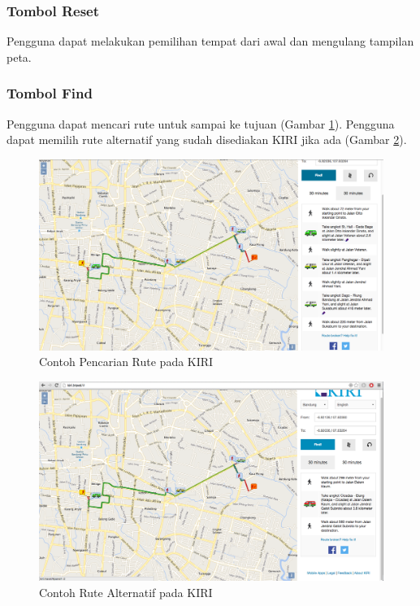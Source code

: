 \subsubsection{Tombol Reset}
Pengguna dapat melakukan pemilihan tempat dari awal dan mengulang tampilan peta. 

\subsubsection{Tombol Find}
Pengguna dapat mencari rute untuk sampai ke tujuan (Gambar \ref{fig:4_KIRI_find}). Pengguna dapat memilih rute alternatif yang sudah disediakan KIRI jika ada (Gambar \ref{fig:4_KIRI_find_alternate}).

\begin{figure}[H]
	\centering
	\includegraphics[scale=0.3]{Gambar/KIRI-find}
	\caption{Contoh Pencarian Rute pada KIRI} 
	\label{fig:4_KIRI_find}
\end{figure}

\begin{figure}[H]
	\centering
	\includegraphics[scale=0.3]{Gambar/KIRI-find-alternate}
	\caption{Contoh Rute Alternatif pada KIRI} 
	\label{fig:4_KIRI_find_alternate}
\end{figure}
